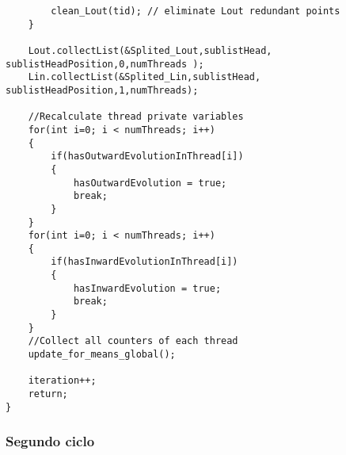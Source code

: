 \begin{lstlisting}
		clean_Lout(tid); // eliminate Lout redundant points
	}
		
	Lout.collectList(&Splited_Lout,sublistHead, sublistHeadPosition,0,numThreads );
	Lin.collectList(&Splited_Lin,sublistHead, sublistHeadPosition,1,numThreads);
	
	//Recalculate thread private variables
	for(int i=0; i < numThreads; i++)
	{
		if(hasOutwardEvolutionInThread[i])
		{
			hasOutwardEvolution = true;
			break;
		}
	}
	for(int i=0; i < numThreads; i++)
	{
		if(hasInwardEvolutionInThread[i])
		{
			hasInwardEvolution = true;
			break;
		}
	}
	//Collect all counters of each thread
	update_for_means_global();
	
	iteration++;
	return;
}
\end{lstlisting}

\subsubsection{Segundo ciclo}


